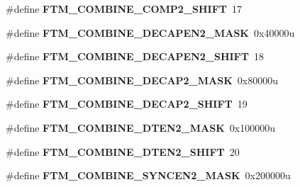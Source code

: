 \begin{DoxyCompactItemize}
\item 
\hypertarget{group___f_t_m___register___masks_ga6f9c535470be4fce32ae6edc8a9fd54a}{}\#define {\bfseries F\+T\+M\+\_\+\+C\+O\+M\+B\+I\+N\+E\+\_\+\+C\+O\+M\+P2\+\_\+\+S\+H\+I\+F\+T}~17\label{group___f_t_m___register___masks_ga6f9c535470be4fce32ae6edc8a9fd54a}

\item 
\hypertarget{group___f_t_m___register___masks_ga38101c934966b16d7394e32a393a5adf}{}\#define {\bfseries F\+T\+M\+\_\+\+C\+O\+M\+B\+I\+N\+E\+\_\+\+D\+E\+C\+A\+P\+E\+N2\+\_\+\+M\+A\+S\+K}~0x40000u\label{group___f_t_m___register___masks_ga38101c934966b16d7394e32a393a5adf}

\item 
\hypertarget{group___f_t_m___register___masks_ga63c12c9b713d5078d861e14c2d34aea6}{}\#define {\bfseries F\+T\+M\+\_\+\+C\+O\+M\+B\+I\+N\+E\+\_\+\+D\+E\+C\+A\+P\+E\+N2\+\_\+\+S\+H\+I\+F\+T}~18\label{group___f_t_m___register___masks_ga63c12c9b713d5078d861e14c2d34aea6}

\item 
\hypertarget{group___f_t_m___register___masks_ga94d0092dd5448a53c187d23ab9f7c52a}{}\#define {\bfseries F\+T\+M\+\_\+\+C\+O\+M\+B\+I\+N\+E\+\_\+\+D\+E\+C\+A\+P2\+\_\+\+M\+A\+S\+K}~0x80000u\label{group___f_t_m___register___masks_ga94d0092dd5448a53c187d23ab9f7c52a}

\item 
\hypertarget{group___f_t_m___register___masks_ga79322ba97c65c632a32e7cf7790286f9}{}\#define {\bfseries F\+T\+M\+\_\+\+C\+O\+M\+B\+I\+N\+E\+\_\+\+D\+E\+C\+A\+P2\+\_\+\+S\+H\+I\+F\+T}~19\label{group___f_t_m___register___masks_ga79322ba97c65c632a32e7cf7790286f9}

\item 
\hypertarget{group___f_t_m___register___masks_gadd286edd7ecc4625be042f1583ea8a74}{}\#define {\bfseries F\+T\+M\+\_\+\+C\+O\+M\+B\+I\+N\+E\+\_\+\+D\+T\+E\+N2\+\_\+\+M\+A\+S\+K}~0x100000u\label{group___f_t_m___register___masks_gadd286edd7ecc4625be042f1583ea8a74}

\item 
\hypertarget{group___f_t_m___register___masks_ga46657f8744aea437178eb9de3a25b0ff}{}\#define {\bfseries F\+T\+M\+\_\+\+C\+O\+M\+B\+I\+N\+E\+\_\+\+D\+T\+E\+N2\+\_\+\+S\+H\+I\+F\+T}~20\label{group___f_t_m___register___masks_ga46657f8744aea437178eb9de3a25b0ff}

\item 
\hypertarget{group___f_t_m___register___masks_ga9b171aec492022bb55593f6bfae038da}{}\#define {\bfseries F\+T\+M\+\_\+\+C\+O\+M\+B\+I\+N\+E\+\_\+\+S\+Y\+N\+C\+E\+N2\+\_\+\+M\+A\+S\+K}~0x200000u\label{group___f_t_m___register___masks_ga9b171aec492022bb55593f6bfae038da}


\end{DoxyCompactItemize}
